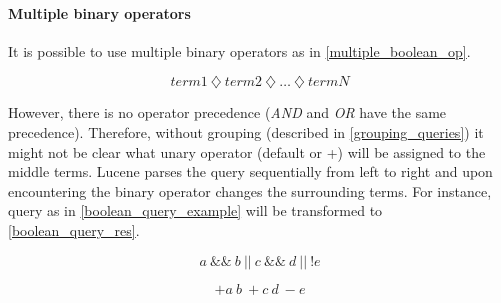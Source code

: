 \paragraph{Multiple binary operators}
It is possible to use multiple binary operators as in \ref{multiple_boolean_op}.

\begin{equation}
\label{multiple_boolean_op}
term1\ \diamondsuit \ term2\ \diamondsuit \ … \ \diamondsuit \ termN
\end{equation}

However, there is no operator precedence (\textit{AND} and \textit{OR} have the same precedence). Therefore, without grouping
(described in \ref{grouping_queries}) it might
not be clear what unary operator (default or +) will be assigned to the middle terms.
Lucene parses the query sequentially from left to right and upon encountering the binary operator changes the surrounding terms. For instance,
query as in \ref{boolean_query_example} will be transformed to \ref{boolean_query_res}.

\begin{equation}
\label{boolean_query_example}
a\ \&\&\ b\ \vert\vert\ c\ \&\&\ d\ \vert\vert\ !e
\end{equation}

\begin{equation}
\label{boolean_query_res}
{+}a\ b\ {+}c\ d\ {-}e
\end{equation}

